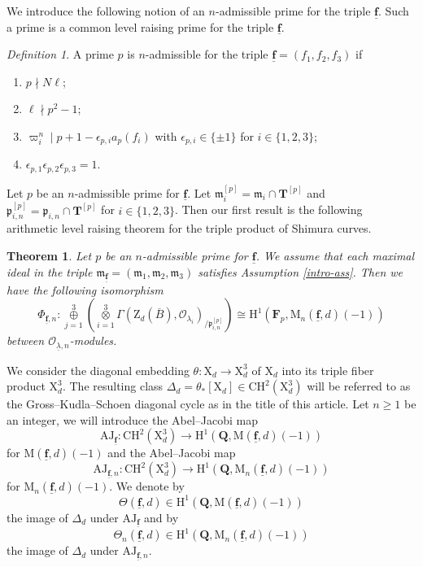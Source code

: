 \documentclass[10pt]{amsart}
\numberwithin{equation}{section}
\theoremstyle{plain}
\numberwithin{equation}{section}
\newtheorem{thm}{Theorem}
\theoremstyle{definition}
\theoremstyle{remark}
\newtheorem{intro-definition}[theorem]{Definition}
\def\frakm{\mathfrak{m}}
\def\undlamb{\underline{\lambda}}
\def\triplef{\underline{\mathbf{f}}}
\def\threetensor{\overset{3}{\underset{i=1}\otimes}}
\def\threesum{\overset{3}{\underset{j=1}\oplus} }
\def\calO{\mathcal{O}}
\def\frakm{\mathfrak{m}}
\def\frakp{\mathfrak{p}}
\def\FF{\mathbf{F}}
\def\QQ{\mathbf{Q}}
\def\TT{\mathbf{T}}
\def\rmH{\mathrm{H}}
\def\rmM{\mathrm{M}}
\def\rmX{\mathrm{X}}
\def\rmZ{\mathrm{Z}}
\begin{document}
We introduce the following notion of an $n$-admissible prime for the triple $\triplef$. Such a  prime is a common level raising prime for the triple $\triplef$.
\begin{intro-definition}
A prime $p$ is $n$-admissible for the triple $\triplef=(f_{1}, f_{2}, f_{3})$ if
\begin{enumerate}
\item $p\nmid N\ell$;
\item $\ell\nmid p^{2}-1$;
\item $\varpi^{n}_{i}\mid p+1-\epsilon_{p, i}a_{p}(f_{i})$ with $\epsilon_{p,i}\in \{\pm1\}$ for $i\in\{1, 2, 3\}$;
\item $\epsilon_{p, 1}\epsilon_{p, 2}\epsilon_{p, 3}=1$.
\end{enumerate}
\end{intro-definition}
Let $p$ be an $n$-admissible prime for $\triplef$. Let $\frakm^{[p]}_{i}=\frakm_{i}\cap \TT^{[p]}$ and $\frakp^{[p]}_{i, n}=\frakp_{i,n}\cap \TT^{[p]}$ for $i\in\{1, 2, 3\}$. Then our first result is the following arithmetic level raising theorem for the triple product of Shimura curves. 
\begin{thm}\label{intro-level-raise}
Let $p$ be an $n$-admissible prime for $\triplef$. We assume that each maximal ideal in the triple $\frakm_{\triplef}=(\frakm_{1}, \frakm_{2}, \frakm_{3})$ satisfies Assumption \ref{intro-ass}. Then we have the following isomorphism
\begin{equation*}
\Phi_{\triplef, n}:\threesum(\threetensor\Gamma(\rmZ_{d}(\overline{B}),\calO_{\lambda_{i}})_{/\frakp^{[p]}_{i, n}})\cong\rmH^{1}(\FF_{p}, \rmM_{n}(\triplef, d)(-1))
\end{equation*}
between $\calO_{\undlamb, n}$-modules. 
\end{thm}

We consider the diagonal embedding $\theta: \rmX_{d}\rightarrow \rmX_{d}^{3}$ of $\rmX_{d}$ into its triple fiber product $\rmX^{3}_{d}$. The resulting class $\Delta_{d}=\theta_{*}[\rmX_{d}]\in \mathrm{CH}^{2}(\rmX^{3}_{d})$ will be referred to as the {Gross--Kudla--Schoen diagonal cycle} as in the title of this article. Let $n\geq 1$ be an integer, we will introduce the Abel--Jacobi map
\begin{equation*}
\mathrm{AJ}_{\triplef}: \mathrm{CH}^{2}(\rmX^{3}_{d})\rightarrow \rmH^{1}(\QQ,  \rmM(\triplef, d)(-1))
\end{equation*} 
for  $\rmM(\triplef, d)(-1)$ and the Abel--Jacobi map 
\begin{equation*}
\mathrm{AJ}_{\triplef, n}: \mathrm{CH}^{2}(\rmX^{3}_{d})\rightarrow \rmH^{1}(\QQ,  \rmM_{n}(\triplef, d)(-1))
\end{equation*}
for $\rmM_{n}(\triplef, d)(-1)$. We denote by 
\begin{equation*}
\Theta(\triplef, d) \in \rmH^{1}(\QQ,  \rmM(\triplef, d)(-1)) 
\end{equation*}
the image of $\Delta_{d}$ under $\mathrm{AJ}_{\triplef}$ and by 
\begin{equation*}
\Theta_{n}(\triplef, d)\in \rmH^{1}(\QQ,  \rmM_{n}(\triplef, d)(-1)) 
\end{equation*}
the image of $\Delta_{d}$ under $\mathrm{AJ}_{\triplef, n}$. 
\end{document}
